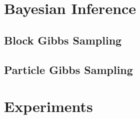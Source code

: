 \section{Bayesian Inference}

\subsection{Block Gibbs Sampling}

\subsection{Particle Gibbs Sampling}

\section{Experiments}

